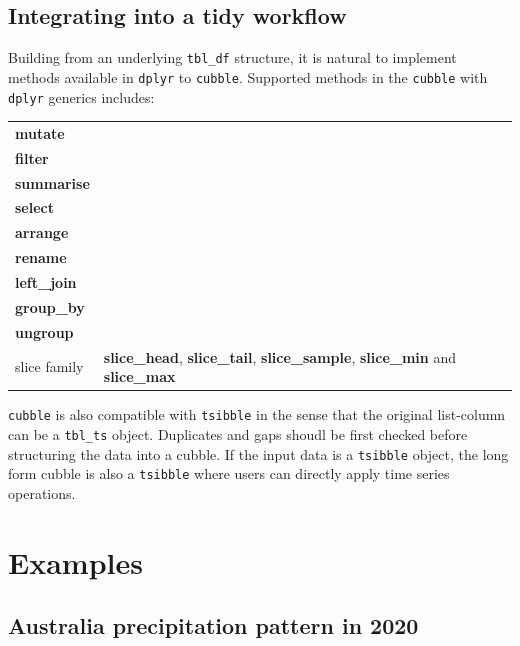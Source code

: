 \documentclass[
]{jss}
\begin{document}
\hypertarget{integrating-into-a-tidy-workflow}{%
\subsection{Integrating into a tidy
workflow}\label{integrating-into-a-tidy-workflow}}

Building from an underlying \texttt{tbl\_df} structure, it is natural to
implement methods available in \texttt{dplyr} to \texttt{cubble}.
Supported methods in the \texttt{cubble} with \texttt{dplyr} generics
includes:

\begin{center}
\begin{tabular}{ | m{5em} | m{15cm}| } 
\textbf{mutate} \\
\textbf{filter}\\
\textbf{summarise} \\
\textbf{select} \\
\textbf{arrange} \\
\textbf{rename} \\
\textbf{left\_join} \\
\textbf{group\_by} \\
\textbf{ungroup}\\
slice family & \textbf{slice\_head}, \textbf{slice\_tail}, \textbf{slice\_sample}, \textbf{slice\_min} and \textbf{slice\_max} \\
\end{tabular}
\end{center}

\texttt{cubble} is also compatible with \texttt{tsibble} in the sense
that the original list-column can be a \texttt{tbl\_ts} object.
Duplicates and gaps shoudl be first checked before structuring the data
into a cubble. If the input data is a \texttt{tsibble} object, the long
form cubble is also a \texttt{tsibble} where users can directly apply
time series operations.

\newpage

\hypertarget{examples}{%
\section{Examples}\label{examples}}

\hypertarget{australia-precipitation-pattern-in-2020}{%
\subsection{Australia precipitation pattern in
2020}\label{australia-precipitation-pattern-in-2020}}
\end{document}
